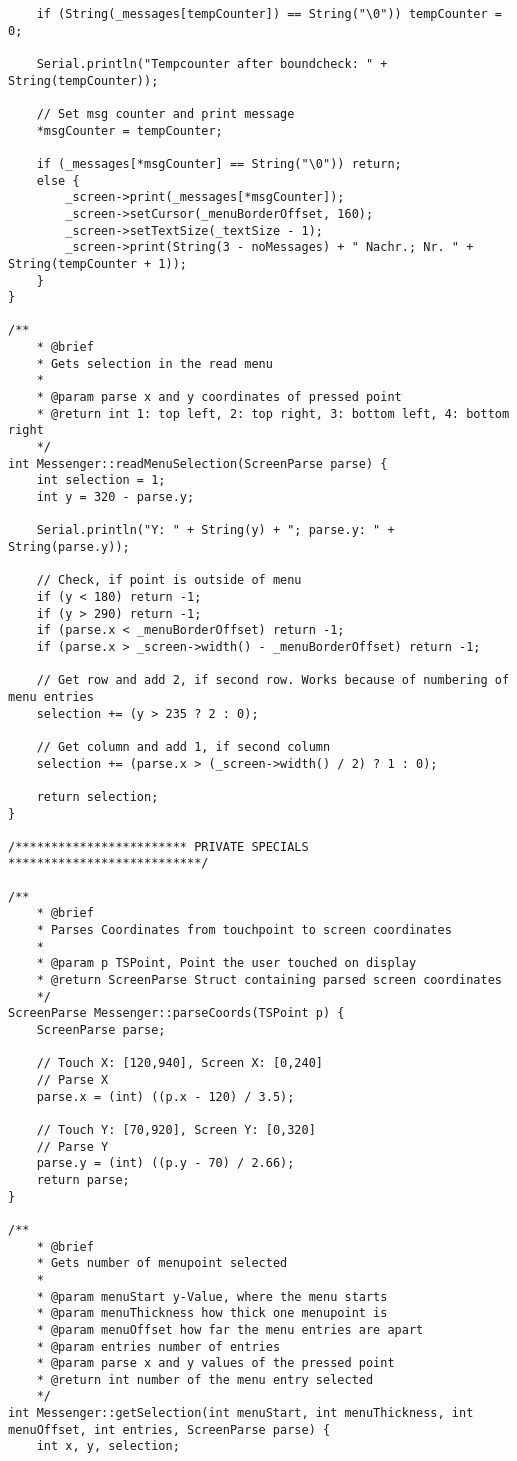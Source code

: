 \documentclass[a4paper, 11pt]{scrartcl}
\begin{document}
\begin{lstlisting}
    if (String(_messages[tempCounter]) == String("\0")) tempCounter = 0;

    Serial.println("Tempcounter after boundcheck: " + String(tempCounter));
    
    // Set msg counter and print message
    *msgCounter = tempCounter;

    if (_messages[*msgCounter] == String("\0")) return;
    else {
        _screen->print(_messages[*msgCounter]);
        _screen->setCursor(_menuBorderOffset, 160);
        _screen->setTextSize(_textSize - 1);
        _screen->print(String(3 - noMessages) + " Nachr.; Nr. " + String(tempCounter + 1));
    }
}

/**
    * @brief 
    * Gets selection in the read menu
    * 
    * @param parse x and y coordinates of pressed point
    * @return int 1: top left, 2: top right, 3: bottom left, 4: bottom right
    */
int Messenger::readMenuSelection(ScreenParse parse) {
    int selection = 1;
    int y = 320 - parse.y;

    Serial.println("Y: " + String(y) + "; parse.y: " + String(parse.y));

    // Check, if point is outside of menu
    if (y < 180) return -1;
    if (y > 290) return -1;
    if (parse.x < _menuBorderOffset) return -1;
    if (parse.x > _screen->width() - _menuBorderOffset) return -1;

    // Get row and add 2, if second row. Works because of numbering of menu entries
    selection += (y > 235 ? 2 : 0);

    // Get column and add 1, if second column
    selection += (parse.x > (_screen->width() / 2) ? 1 : 0);

    return selection;
}

/************************ PRIVATE SPECIALS ***************************/

/**
    * @brief 
    * Parses Coordinates from touchpoint to screen coordinates
    * 
    * @param p TSPoint, Point the user touched on display
    * @return ScreenParse Struct containing parsed screen coordinates
    */
ScreenParse Messenger::parseCoords(TSPoint p) {
    ScreenParse parse;
    
    // Touch X: [120,940], Screen X: [0,240]
    // Parse X
    parse.x = (int) ((p.x - 120) / 3.5);

    // Touch Y: [70,920], Screen Y: [0,320]
    // Parse Y
    parse.y = (int) ((p.y - 70) / 2.66);
    return parse;
}

/**
    * @brief 
    * Gets number of menupoint selected
    * 
    * @param menuStart y-Value, where the menu starts
    * @param menuThickness how thick one menupoint is
    * @param menuOffset how far the menu entries are apart
    * @param entries number of entries
    * @param parse x and y values of the pressed point
    * @return int number of the menu entry selected
    */
int Messenger::getSelection(int menuStart, int menuThickness, int menuOffset, int entries, ScreenParse parse) {
    int x, y, selection;


\end{lstlisting}
\end{document}
